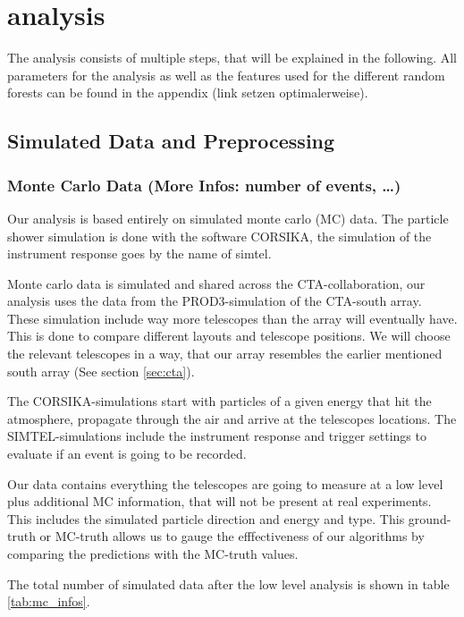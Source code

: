\chapter{analysis}\label{analysis}

The analysis consists of multiple steps, that will be explained in the following.
All parameters for the analysis as well as the features used for the
different random forests can be found in the appendix (link setzen optimalerweise).

\section{Simulated Data and Preprocessing}

\subsection{Monte Carlo Data (More Infos: number of events, \ldots)}
Our analysis is based entirely on simulated monte carlo (MC) data.
The particle shower simulation is done with the software CORSIKA, 
the simulation of the instrument response goes by the name of simtel.

Monte carlo data is simulated and shared across the CTA-collaboration, 
our analysis uses the data from the PROD3-simulation of 
the CTA-south array. These simulation include way more telescopes 
than the array will eventually have. This is done to compare
different layouts and telescope positions.
We will choose the relevant telescopes in a way, that
our array resembles the earlier mentioned south array (See section \ref{sec:cta}).

The CORSIKA-simulations start with particles of a given energy that hit the atmosphere,
propagate through the air and arrive at the telescopes locations.
The SIMTEL-simulations include the instrument response and trigger settings to
evaluate if an event is going to be recorded.

Our data contains everything the telescopes are going to measure
at a low level
plus additional MC information, that will not be present at real experiments.
This includes the simulated particle direction and energy and type.
This ground-truth or MC-truth allows us to gauge the efffectiveness of our 
algorithms by comparing the predictions with the MC-truth values.

The total number of simulated data after the low level analysis 
is shown in table \ref{tab:mc_infos}.

